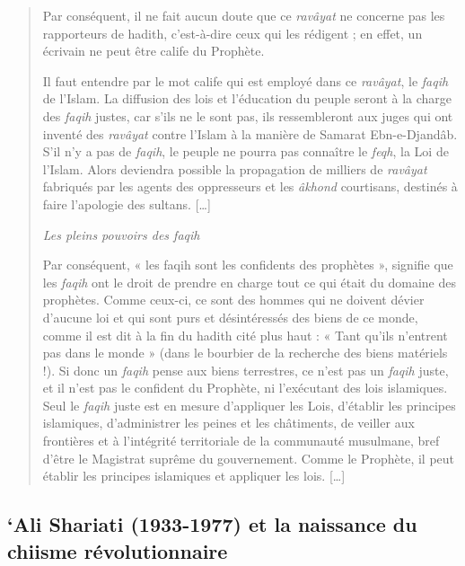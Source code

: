 \begin{quote}
Par conséquent, il ne fait aucun doute que ce \emph{ravâyat} ne concerne
pas les rapporteurs de hadith, c'est-à-dire ceux qui les rédigent ; en
effet, un écrivain ne peut être calife du Prophète.

Il faut entendre par le mot calife qui est employé dans ce
\emph{ravâyat}, le \emph{faqih} de l'Islam. La diffusion des lois et
l'éducation du peuple seront à la charge des \emph{faqih} justes, car
s'ils ne le sont pas, ils ressembleront aux juges qui ont inventé des
\emph{ravâyat} contre l'Islam à la manière de Samarat Ebn-e-Djandâb.
S'il n'y a pas de \emph{faqih}, le peuple ne pourra pas connaître le
\emph{feqh}, la Loi de l'Islam. Alors deviendra possible la propagation
de milliers de \emph{ravâyat} fabriqués par les agents des oppresseurs
et les \emph{âkhond} courtisans, destinés à faire l'apologie des
sultans. {[}\ldots{]}

\emph{Les pleins pouvoirs des faqih}

Par conséquent, « les faqih sont les confidents des prophètes »,
signifie que les \emph{faqih} ont le droit de prendre en charge tout ce
qui était du domaine des prophètes. Comme ceux-ci, ce sont des hommes
qui ne doivent dévier d'aucune loi et qui sont purs et désintéressés des
biens de ce monde, comme il est dit à la fin du hadith cité plus haut :
« Tant qu'ils n'entrent pas dans le monde » (dans le bourbier de la
recherche des biens matériels !). Si donc un \emph{faqih} pense aux
biens terrestres, ce n'est pas un \emph{faqih} juste, et il n'est pas le
confident du Prophète, ni l'exécutant des lois islamiques. Seul le
\emph{faqih} juste est en mesure d'appliquer les Lois, d'établir les
principes islamiques, d'administrer les peines et les châtiments, de
veiller aux frontières et à l'intégrité territoriale de la communauté
musulmane, bref d'être le Magistrat suprême du gouvernement. Comme le
Prophète, il peut établir les principes islamiques et appliquer les
lois. {[}\ldots{]}


 
\end{quote}
    
    
    
   \subsection{ `Ali Shariati (1933-1977) et la naissance du chiisme révolutionnaire}
   
